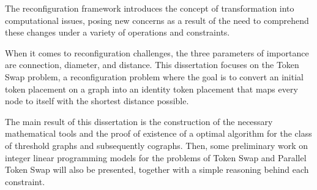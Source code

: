 The reconfiguration framework introduces the concept of 
transformation into computational issues, posing new 
concerns as a result of the need to comprehend these 
changes under a variety of operations and constraints.

When it comes to reconfiguration challenges, the three 
parameters of importance are connection, diameter,
and distance.
This dissertation focuses on the Token Swap problem, 
a reconfiguration problem where the goal is to convert 
an initial token placement on a graph into an identity 
token placement that maps every node to itself with the 
shortest distance possible.

The main result of this dissertation is the construction
of the necessary mathematical tools and the proof of
existence of a optimal algorithm for the class of threshold
graphs and subsequently cographs.
Then, some preliminary work on integer linear programming
models for the problems of Token Swap and Parallel Token Swap 
will also be presented, together with a simple reasoning
behind each constraint.

